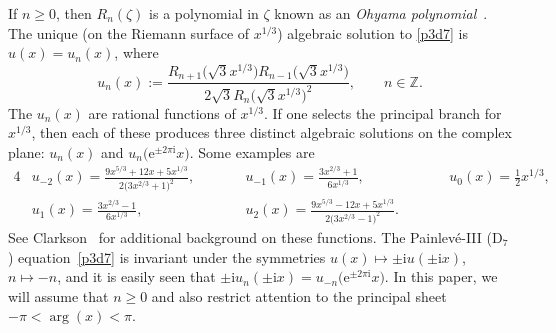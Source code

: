 \documentclass[11pt]{article}
\numberwithin{equation}{section}
\numberwithin{equation}{section}
\begin{document}
If $n\geq 0$, then $R_n(\zeta)$ is a polynomial in $\zeta$ known as an
\emph{Ohyama polynomial}~\cite{Ohyama:2006}. The unique \big(on the Riemann surface of $x^{1/3}$\big) algebraic solution to
\eqref{p3d7} is $u(x)=u_n(x)$, where
\begin{equation*}
u_n(x) := \frac{R_{n+1}\bigl(\sqrt{3}x^{1/3}\bigr)R_{n-1}\bigl(\sqrt{3}x^{1/3}\bigr)}{2\sqrt{3}R_n\bigl(\sqrt{3}x^{1/3}\bigr)^2},
\qquad n\in\mathbb{Z}.
\end{equation*}
The $u_n(x)$ are rational functions of $x^{1/3}$. If one selects the principal
branch for $x^{1/3}$, then each of these produces three distinct algebraic solutions
on the complex plane: $u_n(x)$ and $u_n\bigl(\mathrm{e}^{\pm 2\pi\mathrm{i}}x\bigr)$. Some
examples are
\begin{alignat*}{4}
& u_{-2}(x) = \frac{9x^{5/3}+12x+5x^{1/3}}{2\bigl(3x^{2/3}+1\bigr)^2}, \qquad &&
u_{-1}(x) = \frac{3x^{2/3}+1}{6x^{1/3}}, \qquad &&
u_0(x) = \frac{1}{2}x^{1/3},& \\
& u_1(x) = \frac{3x^{2/3}-1}{6x^{1/3}}, \qquad &&
u_2(x) = \frac{9x^{5/3}-12x+5x^{1/3}}{2\bigl(3x^{2/3}-1\bigr)^2}. \qquad &
\end{alignat*}
See Clarkson~\cite{Clarkson:2003} for additional background on these functions. The Painlev\'e-III (D$_7$) equation~\eqref{p3d7} is invariant under the symmetries $u(x)\mapsto \pm\mathrm{i} u(\pm\mathrm{i} x)$, $n\mapsto -n$, and it is easily seen that $\pm\mathrm{i} u_n(\pm\mathrm{i} x)=u_{-n}\bigl(\mathrm{e}^{\pm 2\pi\mathrm{i}} x\bigr)$.
In this paper, we will assume that $n\ge 0$ and also restrict attention to the principal sheet $-\pi<\arg(x)<\pi$.
\end{document}

